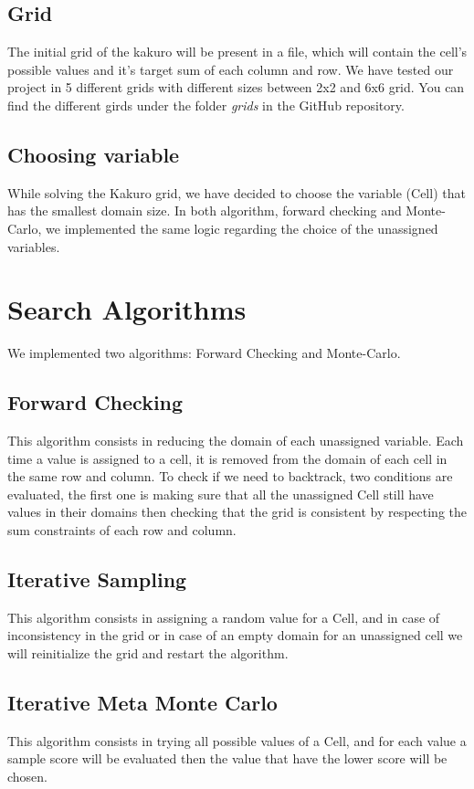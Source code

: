 \documentclass[journal, a4paper]{IEEEtran}
\begin{document}
\subsection{Grid}
The initial grid of the kakuro will be present in a file, which will contain the
cell's possible values and it's target sum of each column and row.
We have tested our project in 5 different grids with different sizes between 2x2
 and 6x6 grid. You can find the different girds under the folder \textit{grids} 
 in the GitHub repository.
\subsection{Choosing variable}
While solving the Kakuro grid, we have decided to choose the variable (Cell) 
that has the smallest domain size. 
In both algorithm, forward checking and Monte-Carlo, we implemented the same 
logic regarding the choice of the unassigned variables.
\section{Search Algorithms}
We implemented two algorithms: Forward Checking and Monte-Carlo.
\subsection{Forward Checking}
This algorithm consists in reducing the domain of each unassigned variable. 
Each time a value is assigned to a cell, it is removed from the domain of each 
cell in the same row and column. To check if we need to backtrack, 
two conditions are evaluated, the first one is making sure that all the 
unassigned Cell still have values in their domains then checking that the grid
 is consistent by respecting the sum constraints of each row and column.
\subsection{Iterative Sampling}
This algorithm consists in assigning a random value for a Cell, and in case of inconsistency in the grid or in case of an empty domain for an unassigned cell we will reinitialize the grid and restart the algorithm. 
\subsection{Iterative Meta Monte Carlo}
This algorithm consists in trying all possible values of a Cell, and for each value a sample score will be evaluated then the value that have the lower score will be chosen. 
\end{document}
